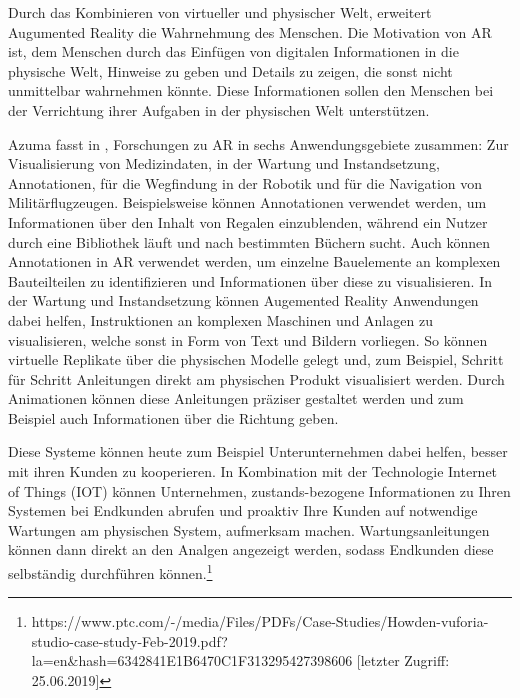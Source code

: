 \cite{Azuma.1997} Durch das Kombinieren von virtueller und physischer Welt, erweitert Augumented Reality die Wahrnehmung des Menschen. Die Motivation von AR ist, dem Menschen durch das Einfügen
von digitalen Informationen in die physische Welt, Hinweise zu geben und Details zu zeigen, die sonst nicht unmittelbar wahrnehmen könnte. Diese Informationen sollen den Menschen 
bei der Verrichtung ihrer Aufgaben in der physischen Welt unterstützen.

Azuma fasst in \cite{Azuma.1997}, Forschungen zu AR in sechs Anwendungsgebiete zusammen: Zur Visualisierung von Medizindaten, in der Wartung 
und Instandsetzung, Annotationen, für die Wegfindung in der Robotik und für die Navigation von Militärflugzeugen. Beispielsweise können Annotationen 
verwendet werden, um Informationen über den Inhalt von Regalen einzublenden, während ein Nutzer durch eine Bibliothek läuft und nach bestimmten Büchern sucht. %
Auch können Annotationen in AR verwendet werden, um einzelne Bauelemente an komplexen Bauteilteilen zu identifizieren und Informationen über diese zu visualisieren. 
In der Wartung und Instandsetzung können Augemented Reality Anwendungen dabei helfen, Instruktionen an komplexen Maschinen und Anlagen zu visualisieren, welche sonst in 
Form von Text und Bildern vorliegen. So können virtuelle Replikate über die physischen Modelle gelegt und, zum Beispiel, Schritt für Schritt Anleitungen direkt am physischen Produkt visualisiert werden. 
Durch Animationen können diese Anleitungen präziser gestaltet werden und zum Beispiel auch Informationen über die Richtung geben. 

Diese Systeme können heute zum Beispiel Unterunternehmen dabei helfen, besser mit ihren Kunden zu kooperieren. In Kombination mit der Technologie Internet of Things (IOT) können Unternehmen,
zustands-bezogene Informationen zu Ihren Systemen bei Endkunden abrufen und proaktiv Ihre Kunden auf notwendige Wartungen am physischen System, aufmerksam machen. Wartungsanleitungen können dann direkt 
an den Analgen angezeigt werden, sodass Endkunden diese selbständig durchführen können.\footnote{https://www.ptc.com/-/media/Files/PDFs/Case-Studies/Howden-vuforia-studio-case-study-Feb-2019.pdf?la=en\&hash=6342841E1B6470C1F313295427398606 [letzter Zugriff: 25.06.2019]}


